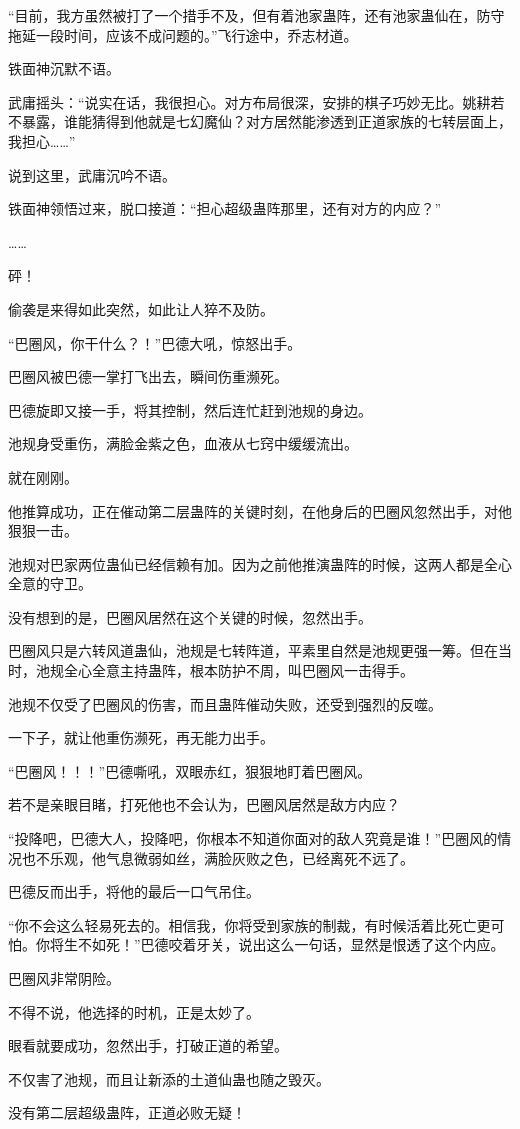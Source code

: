 \begin{this_body}
“目前，我方虽然被打了一个措手不及，但有着池家蛊阵，还有池家蛊仙在，防守拖延一段时间，应该不成问题的。”飞行途中，乔志材道。

铁面神沉默不语。

武庸摇头：“说实在话，我很担心。对方布局很深，安排的棋子巧妙无比。姚耕若不暴露，谁能猜得到他就是七幻魔仙？对方居然能渗透到正道家族的七转层面上，我担心……”

说到这里，武庸沉吟不语。

铁面神领悟过来，脱口接道：“担心超级蛊阵那里，还有对方的内应？”

……

砰！

偷袭是来得如此突然，如此让人猝不及防。

“巴圈风，你干什么？！”巴德大吼，惊怒出手。

巴圈风被巴德一掌打飞出去，瞬间伤重濒死。

巴德旋即又接一手，将其控制，然后连忙赶到池规的身边。

池规身受重伤，满脸金紫之色，血液从七窍中缓缓流出。

就在刚刚。

他推算成功，正在催动第二层蛊阵的关键时刻，在他身后的巴圈风忽然出手，对他狠狠一击。

池规对巴家两位蛊仙已经信赖有加。因为之前他推演蛊阵的时候，这两人都是全心全意的守卫。

没有想到的是，巴圈风居然在这个关键的时候，忽然出手。

巴圈风只是六转风道蛊仙，池规是七转阵道，平素里自然是池规更强一筹。但在当时，池规全心全意主持蛊阵，根本防护不周，叫巴圈风一击得手。

池规不仅受了巴圈风的伤害，而且蛊阵催动失败，还受到强烈的反噬。

一下子，就让他重伤濒死，再无能力出手。

“巴圈风！！！”巴德嘶吼，双眼赤红，狠狠地盯着巴圈风。

若不是亲眼目睹，打死他也不会认为，巴圈风居然是敌方内应？

“投降吧，巴德大人，投降吧，你根本不知道你面对的敌人究竟是谁！”巴圈风的情况也不乐观，他气息微弱如丝，满脸灰败之色，已经离死不远了。

巴德反而出手，将他的最后一口气吊住。

“你不会这么轻易死去的。相信我，你将受到家族的制裁，有时候活着比死亡更可怕。你将生不如死！”巴德咬着牙关，说出这么一句话，显然是恨透了这个内应。

巴圈风非常阴险。

不得不说，他选择的时机，正是太妙了。

眼看就要成功，忽然出手，打破正道的希望。

不仅害了池规，而且让新添的土道仙蛊也随之毁灭。

没有第二层超级蛊阵，正道必败无疑！

\end{this_body}

